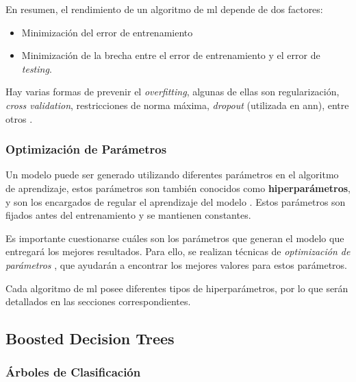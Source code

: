 En resumen, el rendimiento de un algoritmo de \acrshort{ml} depende de dos factores:
\begin{itemize}
    \item Minimización del error de entrenamiento
    \item Minimización de la brecha entre el error de entrenamiento y el error de \emph{testing}.
\end{itemize}

Hay varias formas de prevenir el \emph{overfitting}, algunas de ellas son regularización, \emph{cross validation}, restricciones de norma máxima, \emph{dropout} (utilizada en \acrshort{ann}), entre otros \cite{Buduma}.

\subsubsection{Optimización de Parámetros}

Un modelo puede ser generado utilizando diferentes parámetros en el algoritmo de aprendizaje, estos parámetros son también conocidos como \textbf{hiperparámetros}, y son los encargados de regular el aprendizaje del modelo \cite{Geron}. Estos parámetros son fijados antes del entrenamiento y se mantienen constantes.
%

Es importante cuestionarse cuáles son los parámetros que generan el modelo que entregará los mejores resultados. Para ello, se realizan técnicas de \textit{optimización de parámetros} \cite{Raschka}, que ayudarán a encontrar los mejores valores para estos parámetros.
%

Cada algoritmo de \acrshort{ml} posee diferentes tipos de hiperparámetros, por lo que serán detallados en las secciones correspondientes.

\subsection{Boosted Decision Trees}

\subsubsection{Árboles de Clasificación}

